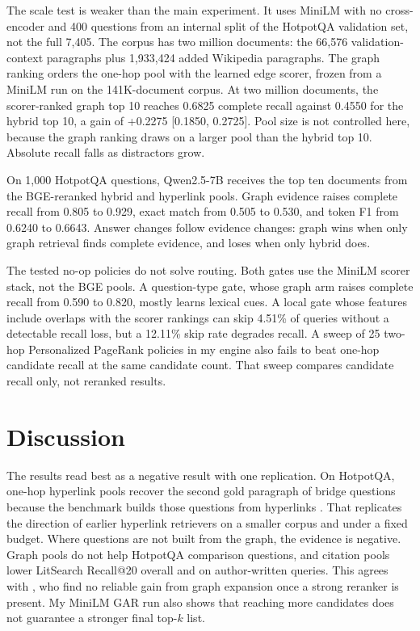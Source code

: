 \documentclass[10pt,twocolumn]{article}
\begin{document}
The scale test is weaker than the main experiment. It uses MiniLM with no
cross-encoder and 400 questions from an internal split of the HotpotQA
validation set, not the full 7,405. The corpus has two million documents: the
66,576 validation-context paragraphs plus 1,933,424 added Wikipedia
paragraphs. The graph ranking orders the one-hop pool with the learned edge
scorer, frozen from a MiniLM run on the 141K-document corpus. At two million documents, the scorer-ranked graph top 10
reaches 0.6825 complete recall against 0.4550 for the hybrid top 10, a gain of
+0.2275 [0.1850, 0.2725]. Pool size is not controlled here, because the graph
ranking draws on a larger pool than the hybrid top 10. Absolute recall falls
as distractors grow.

On 1,000 HotpotQA questions, Qwen2.5-7B \citep{qwen2025qwen25} receives the top ten
documents from the BGE-reranked hybrid and hyperlink pools. Graph evidence raises complete recall from 0.805
to 0.929, exact match from 0.505 to 0.530, and token F1 from 0.6240 to 0.6643.
Answer changes follow evidence changes: graph wins when only graph retrieval
finds complete evidence, and loses when only hybrid does.

The tested no-op policies do not solve routing. Both gates use the MiniLM
scorer stack, not the BGE pools. A question-type gate, whose graph arm raises
complete recall from 0.590 to 0.820, mostly learns lexical cues. A local gate
whose features include overlaps with the scorer rankings can skip 4.51\% of
queries without a detectable recall loss, but a 12.11\% skip rate degrades
recall. A sweep of 25 two-hop Personalized PageRank policies in my engine also
fails to beat one-hop candidate recall at the same candidate count. That
sweep compares candidate recall only, not reranked results.

\section{Discussion}

The results read best as a negative result with one replication. On HotpotQA,
one-hop hyperlink pools recover the second gold paragraph of bridge questions
because the benchmark builds those questions from hyperlinks
\citep{yang2018hotpotqa}. That replicates the direction of earlier hyperlink
retrievers \citep{asai2020paths} on a smaller corpus and under a fixed budget.
Where questions are not built from the graph, the evidence is negative. Graph
pools do not help HotpotQA comparison questions, and citation pools lower
LitSearch Recall@20 overall and on author-written queries. This agrees with
\citet{singh2026beyond}, who find no reliable gain from graph expansion once a
strong reranker is present. My MiniLM GAR run also shows that reaching more
candidates does not guarantee a stronger final top-$k$ list.
\end{document}
